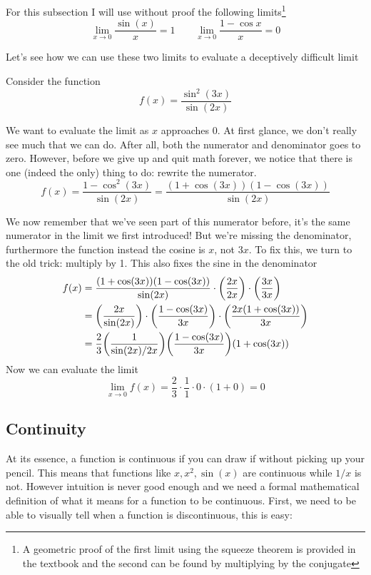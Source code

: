 \begin{Optional}
For this subsection I will use without proof the following limits\footnote{A geometric proof of the first limit using the squeeze theorem is provided in the textbook and the second can be found by multiplying by the conjugate}
\[ \lim_{x \to 0} \frac{\sin(x)}{x} = 1 \qquad \lim_{x \to 0} \frac{1 - \cos x}{x} = 0\]

Let's see how we can use these two limits to evaluate a deceptively difficult limit

\begin{example}
	Consider the function
	\[ f(x) = \frac{\sin^2(3x)}{\sin(2x)} \]
	
	We want to evaluate the limit as $x$ approaches $0$. At first glance, we don't really see much that we can do. After all, both the numerator and denominator goes to zero. However, before we give up and quit math forever, we notice that there is one (indeed the only) thing to do: rewrite the numerator. 
	\[ f(x) = \frac{1 - \cos^2(3x)}{\sin(2x)} = \frac{(1 + \cos(3x))(1 - \cos(3x))}{\sin(2x)} \]
	
	We now remember that we've seen part of this numerator before, it's the same numerator in the limit we first introduced! But we're missing the denominator, furthermore the function instead the cosine is $x$, not $3x$. To fix this, we turn to the old trick: multiply by 1. This also fixes the sine in the denominator
	\begin{align*}
		f(x) &= \frac{(1 + \cos(3x))(1 - \cos(3x))}{\sin(2x)} \cdot \qty(\frac{2x}{2x}) \cdot \qty(\frac{3x}{3x}) \\
		&= \qty(\frac{2x}{\sin(2x)}) \cdot \qty(\frac{1 - \cos(3x)}{3x}) \cdot \qty(\frac{2x(1 + \cos(3x))}{3x}) \\
		&= \frac{2}{3} \qty(\frac{1}{\sin(2x)/2x}) \qty(\frac{1 - \cos(3x)}{3x}) (1 + \cos(3x))
	\end{align*}
	Now we can evaluate the limit
	\[ \lim_{x \to 0} f(x) = \frac{2}{3} \cdot \frac{1}{1} \cdot 0 \cdot (1 + 0) = 0 \]
\end{example}

\end{Optional}

\newpage 
\subsection{Continuity}

At its essence, a function is continuous if you can draw if without picking up your pencil. This means that functions like $x, x^2, \sin(x)$ are continuous while $1/x$ is not. However intuition is never good enough and we need a formal mathematical definition of what it means for a function to be continuous. First, we need to be able to visually tell when a function is discontinuous, this is easy:

